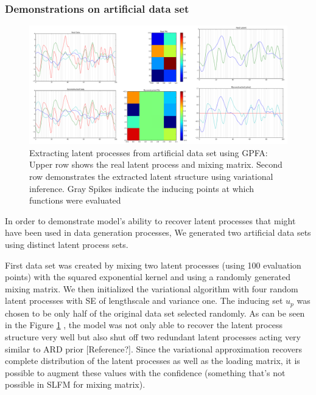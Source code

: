 {\subsubsection{Demonstrations on artificial data set}
\begin{figure}
    \centering
    \includegraphics[scale=0.25]{thesis/images/SLFM_demo1.png}
    \caption{Extracting latent processes from artificial data set using GPFA: Upper row shows the real latent process and mixing matrix. Second row demonstrates the extracted latent structure using variational inference. Gray Spikes indicate the inducing points at which functions were evaluated}
    \label{fig:slfm_demo1}
\end{figure}

In order to demonstrate model’s ability to recover latent processes that might have been used in data generation processes, We generated two artificial data sets using distinct latent process sets. 

First data set was created by mixing two latent processes (using 100 evaluation points) with the squared exponential kernel and using a randomly generated mixing matrix. We then initialized the variational algorithm with four random latent processes with SE of lengthscale and variance one. The inducing set $u_p$ was chosen to be only half of the original data set selected randomly. As can be seen in the Figure \ref{fig:slfm_demo1} , the model was not only able to recover the latent process structure very well but also shut off two redundant latent processes acting very similar to ARD prior [Reference?]. Since the variational approximation recovers complete distribution of the latent processes as well as the loading matrix, it is possible to augment these values with the confidence (something that’s not possible in SLFM for mixing matrix).

}
